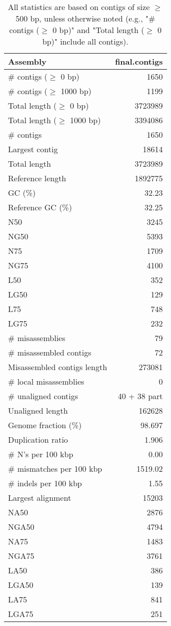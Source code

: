 \documentclass[12pt,a4paper]{article}
\begin{document}
\begin{table}[ht]
\begin{center}
\caption{All statistics are based on contigs of size $\geq$ 500 bp, unless otherwise noted (e.g., "\# contigs ($\geq$ 0 bp)" and "Total length ($\geq$ 0 bp)" include all contigs).}
\begin{tabular}{|l*{1}{|r}|}
\hline
Assembly & final.contigs \\ \hline
\# contigs ($\geq$ 0 bp) & 1650 \\ \hline
\# contigs ($\geq$ 1000 bp) & 1199 \\ \hline
Total length ($\geq$ 0 bp) & 3723989 \\ \hline
Total length ($\geq$ 1000 bp) & 3394086 \\ \hline
\# contigs & 1650 \\ \hline
Largest contig & 18614 \\ \hline
Total length & 3723989 \\ \hline
Reference length & 1892775 \\ \hline
GC (\%) & 32.23 \\ \hline
Reference GC (\%) & 32.25 \\ \hline
N50 & 3245 \\ \hline
NG50 & 5393 \\ \hline
N75 & 1709 \\ \hline
NG75 & 4100 \\ \hline
L50 & 352 \\ \hline
LG50 & 129 \\ \hline
L75 & 748 \\ \hline
LG75 & 232 \\ \hline
\# misassemblies & 79 \\ \hline
\# misassembled contigs & 72 \\ \hline
Misassembled contigs length & 273081 \\ \hline
\# local misassemblies & 0 \\ \hline
\# unaligned contigs & 40 + 38 part \\ \hline
Unaligned length & 162628 \\ \hline
Genome fraction (\%) & 98.697 \\ \hline
Duplication ratio & 1.906 \\ \hline
\# N's per 100 kbp & 0.00 \\ \hline
\# mismatches per 100 kbp & 1519.02 \\ \hline
\# indels per 100 kbp & 1.55 \\ \hline
Largest alignment & 15203 \\ \hline
NA50 & 2876 \\ \hline
NGA50 & 4794 \\ \hline
NA75 & 1483 \\ \hline
NGA75 & 3761 \\ \hline
LA50 & 386 \\ \hline
LGA50 & 139 \\ \hline
LA75 & 841 \\ \hline
LGA75 & 251 \\ \hline
\end{tabular}
\end{center}
\end{table}
\end{document}

